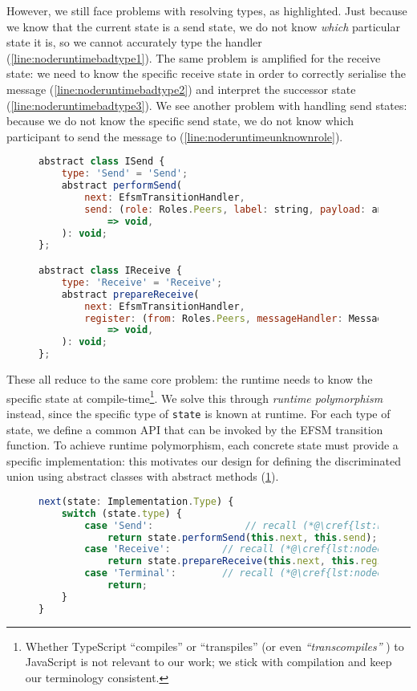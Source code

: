 However, we still face problems with resolving types, as highlighted.
Just because we know that the current state is a send state,
we do not know \textit{which} particular state it is,
so we cannot accurately type the handler (\cref{line:noderuntimebadtype1}).
The same problem is amplified for the receive state:
we need to know the specific receive state in order
to correctly serialise the message (\cref{line:noderuntimebadtype2})
and interpret the successor state (\cref{line:noderuntimebadtype3}).
We see another problem with handling send states:
because we do not know the specific send state, we do not know which
participant to send the message to (\cref{line:noderuntimeunknownrole}).

\begin{figure}[!h]
\begin{lstlisting}[language=javascript,tabsize=2]
abstract class ISend {
	type: 'Send' = 'Send';
	abstract performSend(
		next: EfsmTransitionHandler,
		send: (role: Roles.Peers, label: string, payload: any[]) 
			=> void,
	): void;
};

abstract class IReceive {
	type: 'Receive' = 'Receive';
	abstract prepareReceive(
		next: EfsmTransitionHandler,
		register: (from: Roles.Peers, messageHandler: MessageHandler)
			=> void,
	): void;
};
\end{lstlisting}
\label{lst:nodeabstractclass}
\end{figure}

These all reduce to the same core problem: the runtime
needs to know the specific state at compile-time\footnote{
Whether TypeScript ``compiles'' or ``transpiles''
(or even \textit{``transcompiles''} \cite{transcompiles}) to JavaScript
is not relevant to our work; we stick with compilation
and keep our terminology consistent.}.
We solve this through \textit{runtime polymorphism} instead, since
the specific type of \texttt{state} is known at runtime.
For each type of state, we define a common API that can be invoked
by the EFSM transition function. To achieve runtime polymorphism,
each concrete state must provide a specific implementation: 
this motivates our design for defining the discriminated union
using abstract classes with abstract methods 
(\cref{lst:nodeabstractclass}).

\begin{figure}[!h]
\begin{lstlisting}[language=javascript,tabsize=2]
next(state: Implementation.Type) {
	switch (state.type) {
		case 'Send':				// recall (*@\cref{lst:nodeefsmimplementation} \cref{line:nodeefsmsend}@*)
			return state.performSend(this.next, this.send);
		case 'Receive':			// recall (*@\cref{lst:nodeefsmimplementation} \cref{line:nodeefsmreceive}@*)
			return state.prepareReceive(this.next, this.register);
		case 'Terminal':		// recall (*@\cref{lst:nodeefsmimplementation} \cref{line:nodeefsmterminal}@*)
			return;
	}
}
\end{lstlisting}
\label{lst:noderuntime}
\end{figure}

